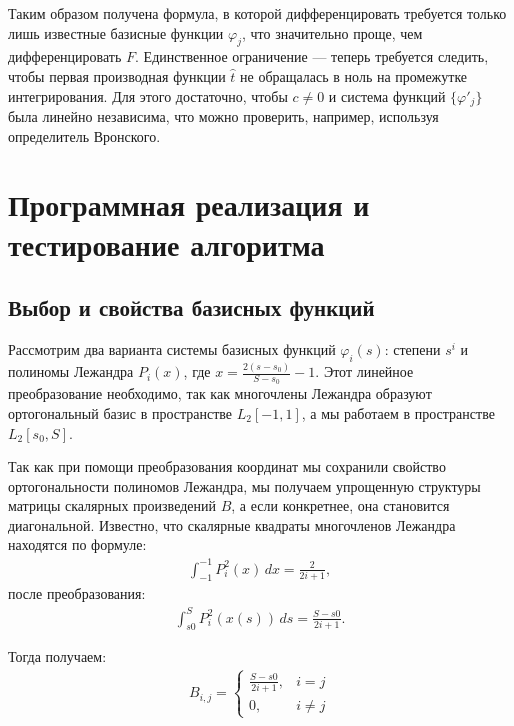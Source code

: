 \documentclass[a4paper,14pt]{extarticle}
\begin{document}
    Таким образом получена формула, в которой дифференцировать требуется только лишь известные базисные функции $\varphi_j$, что значительно проще, чем дифференцировать $F$. Единственное ограничение --- теперь требуется следить, чтобы первая производная функции $\hat{t}$ не обращалась в ноль на промежутке интегрирования. Для этого достаточно, чтобы $c \neq 0$ и система функций $\{\varphi'_j \}$ была линейно независима, что можно проверить, например, используя определитель Вронского.

    \newpage

    \section{Программная реализация и тестирование алгоритма}

    \subsection{Выбор и свойства базисных функций}

    Рассмотрим два варианта системы базисных функций $\varphi_i(s)$: степени $s^i$ и
    полиномы Лежандра $P_i(x)$, где $x = \frac{2(s - s_0)}{S - s_0} - 1$.
    Этот линейное преобразование необходимо, так как многочлены Лежандра
    образуют ортогональный базис
    в пространстве $L_2[-1, 1]$, а мы работаем в пространстве $L_2[s_0, S]$.

    Так как при помощи преобразования координат мы сохранили свойство
    ортогональности полиномов Лежандра, мы получаем упрощенную структуры матрицы
    скалярных произведений $B$, а если конкретнее, она становится диагональной.
    Известно, что скалярные квадраты многочленов Лежандра находятся по формуле:
    \begin{gather*}
        \int_{-1}^{-1}
        P_i^2(x) \, dx
        = \frac{2}{2i + 1},
    \end{gather*}
    после преобразования:
    \begin{gather*}
        \int_{s0}^{S}
        P_i^2(x(s)) \, ds
        = \frac{S - s0}{2i + 1}.
    \end{gather*}

    Тогда получаем:
    \begin{gather*}
        B_{i, j} =
        \begin{cases}
            \frac{S - s0}{2i + 1}, & i = j \\
            0, & i \neq j
        \end{cases}
    \end{gather*}
\end{document}
